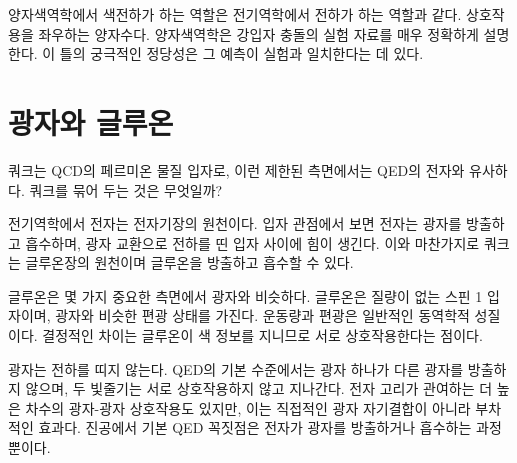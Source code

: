 \begin{classroomqa}
\end{classroomqa}


\begin{classroomqa}
\end{classroomqa}

양자색역학에서 색전하가 하는 역할은 전기역학에서 전하가 하는 역할과 같다. 상호작용을 좌우하는 양자수다. 양자색역학은 강입자 충돌의 실험 자료를 매우 정확하게 설명한다. 이 틀의 궁극적인 정당성은 그 예측이 실험과 일치한다는 데 있다.

\section{광자와 글루온}

쿼크는 QCD의 페르미온 물질 입자로, 이런 제한된 측면에서는 QED의 전자와 유사하다. 쿼크를 묶어 두는 것은 무엇일까?

전기역학에서 전자는 전자기장의 원천이다. 입자 관점에서 보면 전자는 광자를 방출하고 흡수하며, 광자 교환으로 전하를 띤 입자 사이에 힘이 생긴다. 이와 마찬가지로 쿼크는 글루온장의 원천이며 글루온을 방출하고 흡수할 수 있다.

글루온은 몇 가지 중요한 측면에서 광자와 비슷하다. 글루온은 질량이 없는 스핀 1 입자이며, 광자와 비슷한 편광 상태를 가진다. 운동량과 편광은 일반적인 동역학적 성질이다. 결정적인 차이는 글루온이 색 정보를 지니므로 서로 상호작용한다는 점이다.

광자는 전하를 띠지 않는다. QED의 기본 수준에서는 광자 하나가 다른 광자를 방출하지 않으며, 두 빛줄기는 서로 상호작용하지 않고 지나간다. 전자 고리가 관여하는 더 높은 차수의 광자-광자 상호작용도 있지만, 이는 직접적인 광자 자기결합이 아니라 부차적인 효과다. 진공에서 기본 QED 꼭짓점은 전자가 광자를 방출하거나 흡수하는 과정뿐이다.

